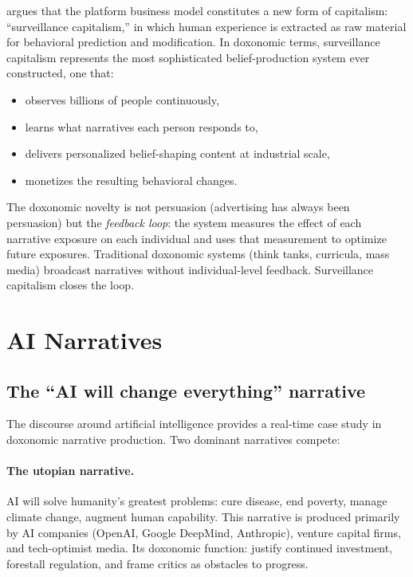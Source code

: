\textcite{zuboff2019} argues that the platform business model constitutes a new form of capitalism: ``surveillance capitalism,'' in which human experience is extracted as raw material for behavioral prediction and modification.
In doxonomic terms, surveillance capitalism represents the most sophisticated belief-production system ever constructed, one that:
\begin{itemize}[nosep]
  \item observes billions of people continuously,
  \item learns what narratives each person responds to,
  \item delivers personalized belief-shaping content at industrial scale,
  \item monetizes the resulting behavioral changes.
\end{itemize}

The doxonomic novelty is not persuasion (advertising has always been persuasion) but the \emph{feedback loop}: the system measures the effect of each narrative exposure on each individual and uses that measurement to optimize future exposures.
Traditional doxonomic systems (think tanks, curricula, mass media) broadcast narratives without individual-level feedback.
Surveillance capitalism closes the loop.

\section{AI Narratives}
\label{sec:ch28-ai}

\subsection{The ``AI will change everything'' narrative}

The discourse around artificial intelligence provides a real-time case study in doxonomic narrative production.
Two dominant narratives compete:

\paragraph{The utopian narrative.}
AI will solve humanity's greatest problems: cure disease, end poverty, manage climate change, augment human capability.
This narrative is produced primarily by AI companies (OpenAI, Google DeepMind, Anthropic), venture capital firms, and tech-optimist media.
Its doxonomic function: justify continued investment, forestall regulation, and frame critics as obstacles to progress.

